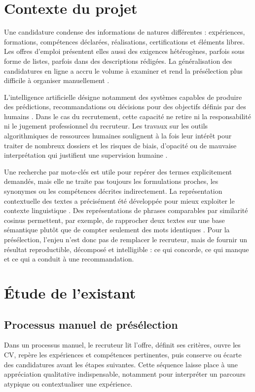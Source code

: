 \section{Contexte du projet}
Une candidature condense des informations de natures différentes : expériences, formations, compétences déclarées, réalisations, certifications et éléments libres. Les offres d'emploi présentent elles aussi des exigences hétérogènes, parfois sous forme de listes, parfois dans des descriptions rédigées. La généralisation des candidatures en ligne a accru le volume à examiner et rend la présélection plus difficile à organiser manuellement \cite{ilo_hrm_2026}.

L'intelligence artificielle désigne notamment des systèmes capables de produire des prédictions, recommandations ou décisions pour des objectifs définis par des humains \cite{nist_ai}. Dans le cas du recrutement, cette capacité ne retire ni la responsabilité ni le jugement professionnel du recruteur. Les travaux sur les outils algorithmiques de ressources humaines soulignent à la fois leur intérêt pour traiter de nombreux dossiers et les risques de biais, d'opacité ou de mauvaise interprétation qui justifient une supervision humaine \cite{koechling2020fairness,ilo_hrm_2026}.

Une recherche par mots-clés est utile pour repérer des termes explicitement demandés, mais elle ne traite pas toujours les formulations proches, les synonymes ou les compétences décrites indirectement. La représentation contextuelle des textes a précisément été développée pour mieux exploiter le contexte linguistique \cite{devlin2019bert}. Des représentations de phrases comparables par similarité cosinus permettent, par exemple, de rapprocher deux textes sur une base sémantique plutôt que de compter seulement des mots identiques \cite{reimers2019sbert}. Pour la présélection, l'enjeu n'est donc pas de remplacer le recruteur, mais de fournir un résultat reproductible, décomposé et intelligible : ce qui concorde, ce qui manque et ce qui a conduit à une recommandation.

\section{Étude de l'existant}

\subsection{Processus manuel de présélection}
Dans un processus manuel, le recruteur lit l'offre, définit ses critères, ouvre les CV, repère les expériences et compétences pertinentes, puis conserve ou écarte des candidatures avant les étapes suivantes. Cette séquence laisse place à une appréciation qualitative indispensable, notamment pour interpréter un parcours atypique ou contextualiser une expérience.

